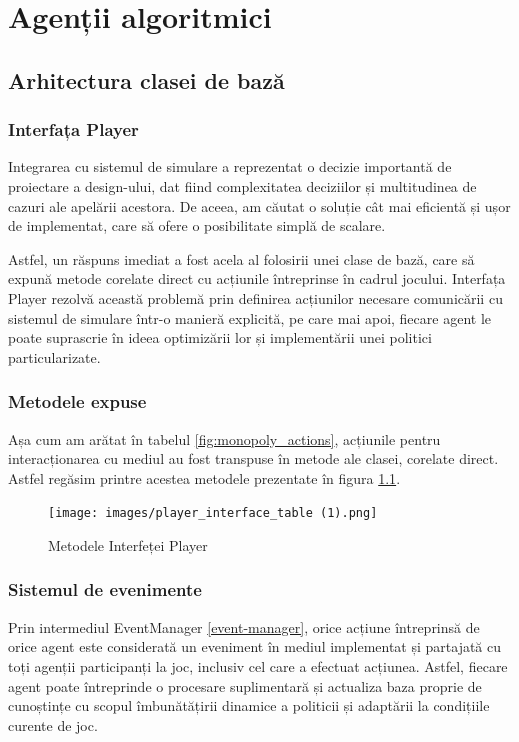 \chapter{Agenții algoritmici}
\section{Arhitectura clasei de bază}
\subsection{Interfața Player}
Integrarea cu sistemul de simulare a reprezentat o decizie importantă de proiectare a design-ului, dat fiind complexitatea deciziilor și multitudinea de cazuri ale apelării acestora. De aceea, am căutat o soluție cât mai eficientă și ușor de implementat, care să ofere o posibilitate simplă de scalare.

Astfel, un răspuns imediat a fost acela al folosirii unei clase de bază, care să expună metode corelate direct cu acțiunile întreprinse în cadrul jocului. Interfața Player rezolvă această problemă prin definirea acțiunilor necesare comunicării cu sistemul de simulare într-o manieră explicită, pe care mai apoi, fiecare agent le poate suprascrie în ideea optimizării lor și implementării unei politici particularizate.

\subsection{Metodele expuse}
Așa cum am arătat în tabelul \ref{fig:monopoly_actions}, acțiunile pentru interacționarea cu mediul au fost transpuse în metode ale clasei, corelate direct. Astfel regăsim printre acestea metodele prezentate în figura \ref{fig:player_interface_methods}.

\begin{figure}[h]
    \centering
    \texttt{[image: images/player\_interface\_table (1).png]}
    \caption{Metodele Interfeței Player}
    \label{fig:player_interface_methods}
\end{figure}

\subsection{Sistemul de evenimente}
Prin intermediul EventManager \ref{event-manager}, orice acțiune întreprinsă de orice agent este considerată un eveniment în mediul implementat și partajată cu toți agenții participanți la joc, inclusiv cel care a efectuat acțiunea. Astfel, fiecare agent poate întreprinde o procesare suplimentară și actualiza baza proprie de cunoștințe cu scopul îmbunătățirii dinamice a politicii și adaptării la condițiile curente de joc.

